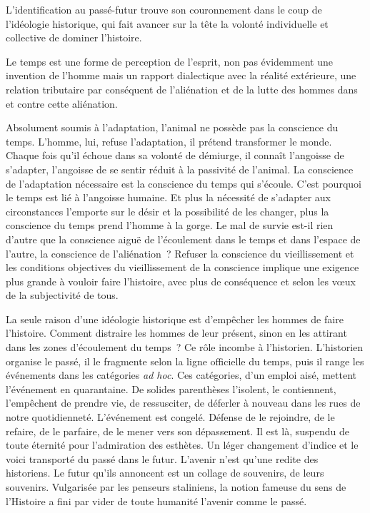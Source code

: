 \documentclass[french,twoside]{book} %
\begin{document}
\noindent L’identification au passé-futur trouve son couronnement dans le coup de l’idéologie historique, qui fait avancer sur la tête la volonté individuelle et collective de dominer l’histoire.\par
Le temps est une forme de perception de l’esprit, non pas évidemment une invention de l’homme mais un rapport dialectique avec la réalité extérieure, une relation tributaire par conséquent de l’aliénation et de la lutte des hommes dans et contre cette aliénation.\par
Absolument soumis à l’adaptation, l’animal ne possède pas la conscience du temps. L’homme, lui, refuse l’adaptation, il prétend transformer le monde. Chaque fois qu’il échoue dans sa volonté de démiurge, il connaît l’angoisse de s’adapter, l’angoisse de se sentir réduit à la passivité de l’animal. La conscience de l’adaptation nécessaire est la conscience du temps qui s’écoule. C’est pourquoi le temps est lié à l’angoisse humaine. Et plus la nécessité de s’adapter aux circonstances l’emporte sur le désir et la possibilité de les changer, plus la conscience du temps prend l’homme à la gorge. Le mal de survie est-il rien d’autre que la conscience aiguë de l’écoulement dans le temps et dans l’espace de l’autre, la conscience de l’aliénation ? Refuser la conscience du vieillissement et les conditions objectives du vieillissement de la conscience implique une exigence plus grande à vouloir faire l’histoire, avec plus de conséquence et selon les vœux de la subjectivité de tous.\par
La seule raison d’une idéologie historique est d’empêcher les hommes de faire l’histoire. Comment distraire les hommes de leur présent, sinon en les attirant dans les zones d’écoulement du temps ? Ce rôle incombe à l’historien. L’historien organise le passé, il le fragmente selon la ligne officielle du temps, puis il range les événements dans les catégories \emph{ad hoc}. Ces catégories, d’un emploi aisé, mettent l’événement en quarantaine. De solides parenthèses l’isolent, le contiennent, l’empêchent de prendre vie, de ressusciter, de déferler à nouveau dans les rues de notre quotidienneté. L’événement est congelé. Défense de le rejoindre, de le refaire, de le parfaire, de le mener vers son dépassement. Il est là, suspendu de toute éternité pour l’admiration des esthètes. Un léger changement d’indice et le voici transporté du passé dans le futur. L’avenir n’est qu’une redite des historiens. Le futur qu’ils annoncent est un collage de souvenirs, de leurs souvenirs. Vulgarisée par les penseurs staliniens, la notion fameuse du sens de l’Histoire a fini par vider de toute humanité l’avenir comme le passé.\par
\end{document}
